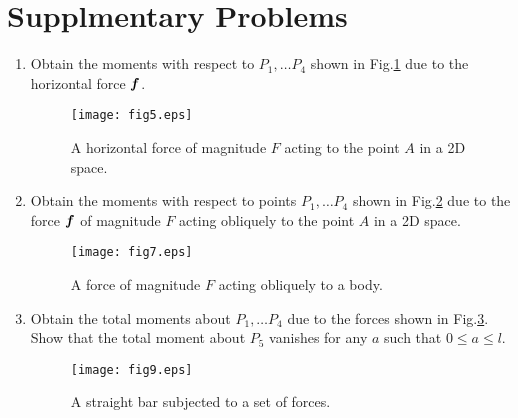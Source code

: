 \documentclass[10pt,a4j]{article}
\begin{document}
\section{Supplmentary Problems}
\begin{enumerate}
\item
	Obtain the moments with respect to $P_1,\dots P_4$ shown 
	in Fig.\ref{fig:fig5} due to the horizontal force $\mbox{\boldmath $f$}$.  
	\begin{figure}[h]
		\begin{center}
		\texttt{[image: fig5.eps]} 
		\end{center}
		\caption{A horizontal force of magnitude $F$ acting to the point $A$ 
		in a 2D space.} 
		\label{fig:fig5}
	\end{figure}
\item
	Obtain the moments with respect to points $P_1,\dots P_4$ shown in Fig.\ref{fig:fig7} 
	due to the force $\mbox{\boldmath $f$}$ of magnitude $F$ acting obliquely to 
	the point $A$ in a 2D space.
	\begin{figure}[h]
		\begin{center}
		\texttt{[image: fig7.eps]} 
		\end{center}
		\caption{A force of magnitude $F$ acting obliquely to a body.} 
		\label{fig:fig7}
	\end{figure}
\item
	Obtain the total moments about $P_1,\dots P_4$ due to the 
	forces shown in Fig.\ref{fig:fig9}. 
	Show that the total moment about $P_5$ vanishes for any $a$ such that 
	$0\leq a \leq l$.
	\begin{figure}[h]
		\begin{center}
		\texttt{[image: fig9.eps]} 
		\end{center}
		\caption{A straight bar subjected to a set of forces.} 
		\label{fig:fig9}
	\end{figure}
\end{enumerate}
\end{document}
